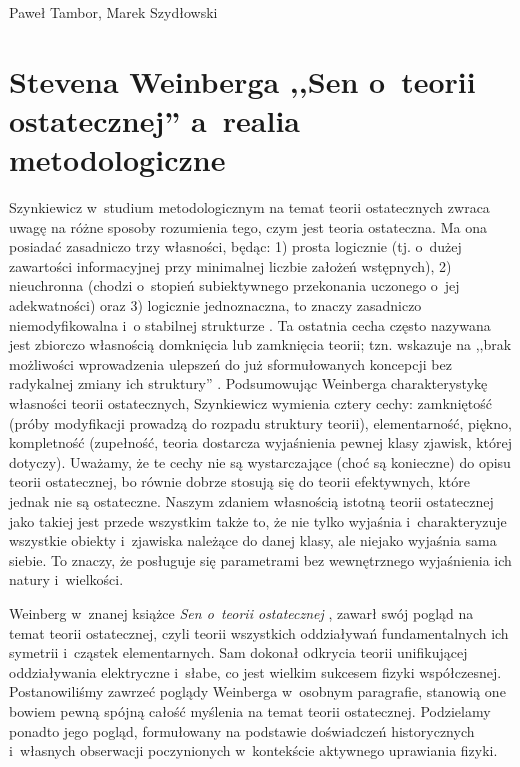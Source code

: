 \begin{artplenv2auth}{Paweł Tambor, Marek Szydłowski}
\section{Stevena Weinberga ,,Sen o~teorii ostatecznej'' a~realia metodologiczne}
Szynkiewicz w~studium metodologicznym na temat teorii ostatecznych zwraca uwagę na różne sposoby rozumienia tego, czym jest teoria ostateczna. Ma ona posiadać zasadniczo trzy własności, będąc: 1) prosta logicznie (tj. o~dużej zawartości informacyjnej przy minimalnej liczbie założeń wstępnych), 2) nieuchronna (chodzi o~stopień subiektywnego przekonania uczonego o~jej adekwatności) oraz 3) logicznie jednoznaczna, to znaczy zasadniczo niemodyfikowalna i~o stabilnej strukturze 
\parencite[][s.~17]{szynkiewicz_teorie_2009}. %
 Ta ostatnia cecha często nazywana jest zbiorczo własnością domknięcia lub zamknięcia teorii; tzn. wskazuje na ,,brak możliwości wprowadzenia ulepszeń do już sformułowanych koncepcji bez radykalnej zmiany ich struktury'' 
\parencite[][s.~19]{szynkiewicz_teorie_2009}. %
 Podsumowując Weinberga charakterystykę własności teorii ostatecznych, Szynkiewicz wymienia cztery cechy: zamkniętość (próby modyfikacji prowadzą do rozpadu struktury teorii), elementarność, piękno, kompletność (zupełność, teoria dostarcza wyjaśnienia pewnej klasy zjawisk, której dotyczy). Uważamy, że te cechy nie są wystarczające (choć są konieczne) do opisu teorii ostatecznej, bo równie dobrze stosują się do teorii efektywnych, które jednak nie są ostateczne. Naszym zdaniem własnością istotną teorii ostatecznej jako takiej jest przede wszystkim także to, że nie tylko wyjaśnia i~charakteryzuje wszystkie obiekty i~zjawiska należące do danej klasy, ale niejako wyjaśnia sama siebie. To znaczy, że posługuje się parametrami bez wewnętrznego wyjaśnienia ich natury i~wielkości.

Weinberg w~znanej książce \textit{Sen o~teorii ostatecznej}
\parencite*[][]{weinberg_sen_1992}, %
 zawarł swój pogląd na temat teorii ostatecznej, czyli teorii wszystkich oddziaływań fundamentalnych ich symetrii i~cząstek elementarnych. Sam dokonał odkrycia teorii unifikującej oddziaływania elektryczne i~słabe, co jest wielkim sukcesem fizyki współczesnej. Postanowiliśmy zawrzeć poglądy Weinberga w~osobnym paragrafie, stanowią one bowiem pewną spójną całość myślenia na temat teorii ostatecznej. Podzielamy ponadto jego pogląd, formułowany na podstawie doświadczeń historycznych i~własnych obserwacji poczynionych w~kontekście aktywnego uprawiania fizyki.


\end{artplenv2auth}
